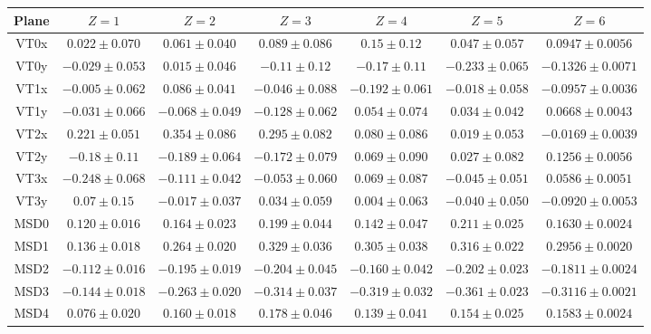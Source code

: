 \begin{table}
	\centering
	\normalsize{%
		\begin{tabular}{ccccccc}
			\hline
			\textbf{Plane} & \textbf{$Z=1$} & \textbf{$Z=2$} & \textbf{$Z=3$} & \textbf{$Z=4$} & \textbf{$Z=5$} & \textbf{$Z=6$} \\
			\hline
			VT0x & $0.022 \pm 0.070$ & $0.061 \pm 0.040$ & $0.089 \pm 0.086$ & $0.15 \pm 0.12$ & $0.047 \pm 0.057$ & $0.0947 \pm 0.0056$\\
			VT0y & $-0.029 \pm 0.053$ & $0.015 \pm 0.046$ & $-0.11 \pm 0.12$ & $-0.17 \pm 0.11$ & $-0.233 \pm 0.065$ & $-0.1326 \pm 0.0071$\\
			VT1x & $-0.005 \pm 0.062$ & $0.086 \pm 0.041$ & $-0.046 \pm 0.088$ & $-0.192 \pm 0.061$ & $-0.018 \pm 0.058$ & $-0.0957 \pm 0.0036$\\
			VT1y & $-0.031 \pm 0.066$ & $-0.068 \pm 0.049$ & $-0.128 \pm 0.062$ & $0.054 \pm 0.074$ & $0.034 \pm 0.042$ & $0.0668 \pm 0.0043$\\
			VT2x & $0.221 \pm 0.051$ & $0.354 \pm 0.086$ & $0.295 \pm 0.082$ & $0.080 \pm 0.086$ & $0.019 \pm 0.053$ & $-0.0169 \pm 0.0039$\\
			VT2y & $-0.18 \pm 0.11$ & $-0.189 \pm 0.064$ & $-0.172 \pm 0.079$ & $0.069 \pm 0.090$ & $0.027 \pm 0.082$ & $0.1256 \pm 0.0056$\\
			VT3x & $-0.248 \pm 0.068$ & $-0.111 \pm 0.042$ & $-0.053 \pm 0.060$ & $0.069 \pm 0.087$ & $-0.045 \pm 0.051$ & $0.0586 \pm 0.0051$\\
			VT3y & $0.07 \pm 0.15$ & $-0.017 \pm 0.037$ & $0.034 \pm 0.059$ & $0.004 \pm 0.063$ & $-0.040 \pm 0.050$ & $-0.0920 \pm 0.0053$\\
			MSD0 & $0.120 \pm 0.016$ & $0.164 \pm 0.023$ & $0.199 \pm 0.044$ & $0.142 \pm 0.047$ & $0.211 \pm 0.025$ & $0.1630 \pm 0.0024$\\
			MSD1 & $0.136 \pm 0.018$ & $0.264 \pm 0.020$ & $0.329 \pm 0.036$ & $0.305 \pm 0.038$ & $0.316 \pm 0.022$ & $0.2956 \pm 0.0020$\\
			MSD2 & $-0.112 \pm 0.016$ & $-0.195 \pm 0.019$ & $-0.204 \pm 0.045$ & $-0.160 \pm 0.042$ & $-0.202 \pm 0.023$ & $-0.1811 \pm 0.0024$\\
			MSD3 & $-0.144 \pm 0.018$ & $-0.263 \pm 0.020$ & $-0.314 \pm 0.037$ & $-0.319 \pm 0.032$ & $-0.361 \pm 0.023$ & $-0.3116 \pm 0.0021$\\
			MSD4 & $0.076 \pm 0.020$ & $0.160 \pm 0.018$ & $0.178 \pm 0.046$ & $0.139 \pm 0.041$ & $0.154 \pm 0.025$ & $0.1583 \pm 0.0024$\\

\end{tabular}}
\end{table}
